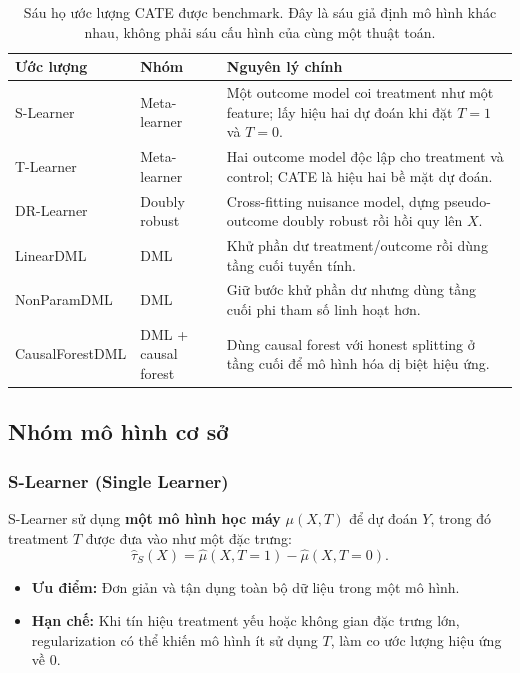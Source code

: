 \documentclass[11pt,a4paper]{article}
\begin{document}
\begin{table}[H]
\centering
\small
\begin{tabularx}{\textwidth}{>{\raggedright\arraybackslash}p{3.0cm}
    >{\raggedright\arraybackslash}p{2.6cm}X}
\toprule
\textbf{Ước lượng} & \textbf{Nhóm} & \textbf{Nguyên lý chính} \\
\midrule
S-Learner & Meta-learner & Một outcome model coi treatment như một feature; lấy hiệu hai dự đoán khi đặt $T=1$ và $T=0$. \\
T-Learner & Meta-learner & Hai outcome model độc lập cho treatment và control; CATE là hiệu hai bề mặt dự đoán. \\
DR-Learner & Doubly robust & Cross-fitting nuisance model, dựng pseudo-outcome doubly robust rồi hồi quy lên $X$. \\
LinearDML & DML & Khử phần dư treatment/outcome rồi dùng tầng cuối tuyến tính. \\
NonParamDML & DML & Giữ bước khử phần dư nhưng dùng tầng cuối phi tham số linh hoạt hơn. \\
CausalForestDML & DML + causal forest & Dùng causal forest với honest splitting ở tầng cuối để mô hình hóa dị biệt hiệu ứng. \\
\bottomrule
\end{tabularx}
\caption{Sáu họ ước lượng CATE được benchmark. Đây là sáu giả định mô hình
khác nhau, không phải sáu cấu hình của cùng một thuật toán.}
\label{tab:cate-estimators}
\end{table}

\subsection{Nhóm mô hình cơ sở}

\subsubsection{S-Learner (Single Learner)}
S-Learner sử dụng \textbf{một mô hình học máy} $\mu(X,T)$ để dự đoán $Y$,
trong đó treatment $T$ được đưa vào như một đặc trưng:
\[
\hat{\tau}_{S}(X)=\hat{\mu}(X,T=1)-\hat{\mu}(X,T=0).
\]
\begin{itemize}
    \item \textbf{Ưu điểm:} Đơn giản và tận dụng toàn bộ dữ liệu trong một mô hình.
    \item \textbf{Hạn chế:} Khi tín hiệu treatment yếu hoặc không gian đặc
    trưng lớn, regularization có thể khiến mô hình ít sử dụng $T$, làm co
    ước lượng hiệu ứng về 0.
\end{itemize}
\end{document}
